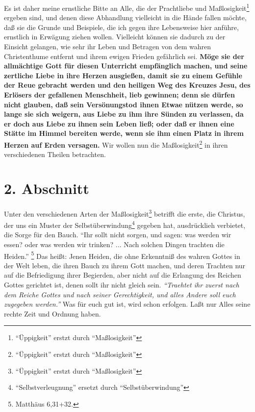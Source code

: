 Es ist daher meine
ernstliche Bitte an Alle, die der Prachtliebe und Maßlosigkeit\footnote{"`Üppigkeit"' erstzt durch "`Maßlosigkeit"'} ergeben sind, und
denen diese Abhandlung vielleicht in die Hände fallen möchte, daß sie die Grunde
und Beispiele, die ich gegen ihre Lebensweise hier anführe, ernstlich in
Erwägung ziehen wollen. Vielleicht können sie dadurch zu der Einsicht gelangen,
wie sehr ihr Leben und Betragen von dem wahren Christenthume entfernt und ihrem
ewigen Frieden gefährlich sei. \textbf{Möge sie der allmächtige Gott für diesen
Unterricht empfänglich machen, und seine zertliche Liebe in ihre Herzen
ausgießen, damit sie zu einem Gefühle der Reue gebracht werden und den heiligen
Weg des Kreuzes Jesu, des Erlösers der gefallenen Menschheit, lieb gewinnen;
denn sie dürfen nicht glauben, daß sein Versönungstod ihnen Etwae nützen werde,
so lange sie sich weigern, aus Liebe zu ihm ihre Sünden zu verlassen, da er doch
aus Liebe zu ihnen sein Leben ließ; oder daß er ihnen eine Stätte im Himmel
bereiten werde, wenn sie ihm einen Platz in ihrem Herzen auf Erden versagen.} Wir
wollen nun die Maßlosigkeit\footnote{"`Üppigkeit"' erstzt durch "`Maßlosigkeit"'} in ihren verschiedenen Theilen betrachten.

\section{2. Abschnitt} \label{kap14_ab2}

Unter den verschiedenen Arten der Maßlosigkeit\footnote{"`Üppigkeit"' erstzt durch "`Maßlosigkeit"'} betrifft die erste, die Christus,
der uns ein Muster der Selbstüberwindung\footnote{"`Selbstverleugnung"' ersetzt durch "`Selbstüberwindung"'} gegeben hat, ausdrücklieh verbietet,
die Sorge für den Bauch.
"`Ihr sollt nicht sorgen, und sagen: was werden wir
essen? oder was werden wir trinken? ... Nach solchen Dingen trachten die
Heiden."'
\footnote{Matthäus 6,31+32.}
Das heißt: Jenen Heiden, die ohne
Erkenntniß des wahren Gottes in der Welt leben, die ihren Bauch zu ihrem Gott
machen, und deren Trachten nur auf die Befriedigung ihrer Begierden, aber nicht
auf die Erlangung des Reichen Gottes gerichtet ist, denen sollt ihr nicht gleich
sein.
\textit{"`Traehtet ihr zuerst nach dem Reiche Gottes und nach seiner
Gerechtigkeit, und alles Andere soll euch zugegeben werden."'} Was für euch gut
ist, wird schon erfolgen. Laßt nur Alles seine rechte Zeit und Ordnung haben.

